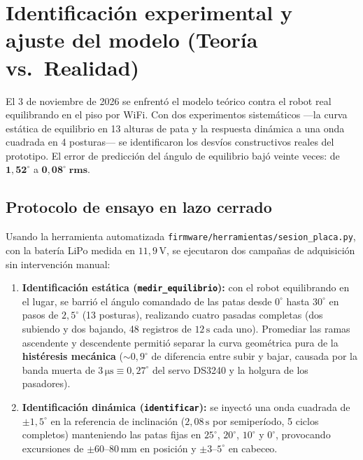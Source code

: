 \documentclass[11pt,a4paper]{report}
\newcommand{\ud}[1]{\,\mathrm{#1}}
\begin{document}
\chapter{Identificación experimental y ajuste del modelo (Teoría vs.\ Realidad)}\label{cap:ajuste}

\begin{idea}
El 3 de noviembre de 2026 se enfrentó el modelo teórico contra el robot real equilibrando en el
piso por WiFi. Con dos experimentos sistemáticos ---la curva estática de equilibrio en 13
alturas de pata y la respuesta dinámica a una onda cuadrada en 4 posturas--- se identificaron
los desvíos constructivos reales del prototipo. El error de predicción del ángulo de
equilibrio bajó veinte veces: de $\mathbf{1{,}52^\circ}$ a $\mathbf{0{,}08^\circ\;\text{rms}}$.
\end{idea}

\section{Protocolo de ensayo en lazo cerrado}

Usando la herramienta automatizada \texttt{firmware/herramientas/sesion\_placa.py}, con la
batería LiPo medida en $11{,}9\ud{V}$, se ejecutaron dos campañas de adquisición sin intervención
manual:

\begin{enumerate}[leftmargin=1.6em]
\item \textbf{Identificación estática (\texttt{medir\_equilibrio}):} con el robot equilibrando en
      el lugar, se barrió el ángulo comandado de las patas desde $0^\circ$ hasta $30^\circ$ en
      pasos de $2{,}5^\circ$ (13 posturas), realizando cuatro pasadas completas (dos subiendo y
      dos bajando, 48 registros de $12\ud{s}$ cada uno). Promediar las ramas ascendente y
      descendente permitió separar la curva geométrica pura de la \textbf{histéresis mecánica}
      ($\sim 0{,}9^\circ$ de diferencia entre subir y bajar, causada por la banda muerta de
      $3\ud{\mu s} \equiv 0{,}27^\circ$ del servo DS3240 y la holgura de los pasadores).
\item \textbf{Identificación dinámica (\texttt{identificar}):} se inyectó una onda cuadrada de
      $\pm 1{,}5^\circ$ en la referencia de inclinación ($2{,}08\ud{s}$ por semiperíodo, 5 ciclos
      completos) manteniendo las patas fijas en $25^\circ$, $20^\circ$, $10^\circ$ y $0^\circ$,
      provocando excursiones de $\pm 60\text{--}80\ud{mm}$ en posición y $\pm 3\text{--}5^\circ$
      en cabeceo.
\end{enumerate}
\end{document}
